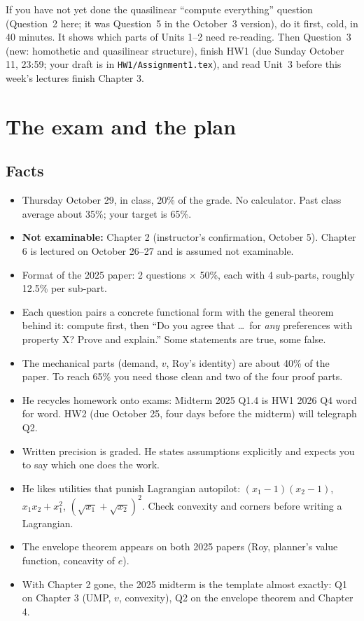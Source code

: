 \documentclass[11pt]{article}
\begin{document}
\begin{here}
If you have not yet done the quasilinear ``compute everything'' question (Question~2 here; it was Question~5 in the October~3 version), do it first, cold, in 40 minutes. It shows which parts of Units 1--2 need re-reading. Then Question~3 (new: homothetic and quasilinear structure), finish HW1 (due Sunday October 11, 23:59; your draft is in \texttt{HW1/Assignment1.tex}), and read Unit~3 before this week's lectures finish Chapter 3.
\end{here}

\tableofcontents
\clearpage

\section*{The exam and the plan}

\subsection*{Facts}
\begin{itemize}
\item Thursday October 29, in class, 20\% of the grade. No calculator. Past class average about 35\%; your target is 65\%.
\item \textbf{Not examinable:} Chapter 2 (instructor's confirmation, October 5). Chapter 6 is lectured on October 26--27 and is assumed not examinable.
\item Format of the 2025 paper: 2 questions $\times$ 50\%, each with 4 sub-parts, roughly 12.5\% per sub-part.
\item Each question pairs a concrete functional form with the general theorem behind it: compute first, then ``Do you agree that \dots\ for \emph{any} preferences with property X? Prove and explain.'' Some statements are true, some false.
\item The mechanical parts (demand, $v$, Roy's identity) are about 40\% of the paper. To reach 65\% you need those clean and two of the four proof parts.
\item He recycles homework onto exams: Midterm 2025 Q1.4 is HW1 2026 Q4 word for word. HW2 (due October 25, four days before the midterm) will telegraph Q2.
\item Written precision is graded. He states assumptions explicitly and expects you to say which one does the work.
\item He likes utilities that punish Lagrangian autopilot: $(x_1-1)(x_2-1)$, $x_1x_2+x_1^2$, $(\sqrt{x_1}+\sqrt{x_2})^2$. Check convexity and corners before writing a Lagrangian.
\item The envelope theorem appears on both 2025 papers (Roy, planner's value function, concavity of $e$).
\item With Chapter 2 gone, the 2025 midterm is the template almost exactly: Q1 on Chapter 3 (UMP, $v$, convexity), Q2 on the envelope theorem and Chapter 4.
\end{itemize}
\end{document}
